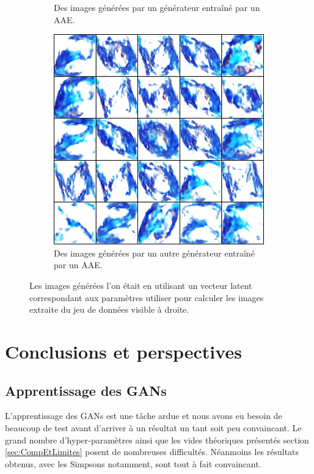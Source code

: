 \documentclass[11pt,francais]{article}
\begin{document}
\begin{figure}[!h]
\begin{subfigure}[b]{0.32\textwidth}
        \caption{Des images générées par un générateur entraîné par un AAE.}
    \end{subfigure}
    \begin{subfigure}[b]{0.32\textwidth}
        \includegraphics[width=\textwidth]{Figures/ComparaisonLS/scan8_eps0,1_lrelu1e06_0.png}
        \caption{Des images générées par un autre générateur entraîné par un AAE.}
    \end{subfigure}
    \caption{Les images générées l'on était en utilisant un vecteur latent correspondant aux paramètres utiliser pour calculer les images extraite du jeu de données visible à droite.}
    \label{fig:fig8}
\end{figure}

\section{Conclusions et perspectives}
\label{sec:Conclusion}

\subsection{Apprentissage des GANs}
L'apprentissage des GANs est une tâche ardue et nous avons eu besoin de beaucoup de test avant d'arriver à un résultat un tant soit peu convaincant. Le grand nombre d'hyper-paramètres ainsi que les vides théoriques présentés section \ref{sec:CompEtLimites} posent de nombreuses difficultés. Néanmoins les résultats obtenus, avec les Simpsons notamment, sont tout à fait convaincant.
\end{document}
